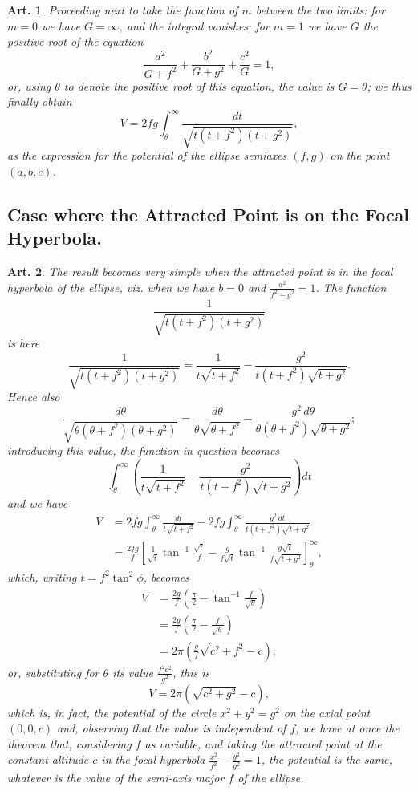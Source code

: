 \documentclass[12pt,a4paper]{article}
\theoremstyle{cayley}
\newtheorem{art}{Art.}[section]
\begin{document}
\begin{art}
Proceeding next to take the function of $m$ between the two limits: for $m=0$ we have $G=\infty$, and the integral vanishes; for $m=1$ we have $G$ the positive root of the equation
\[
\frac{a^2}{G + f^2} + \frac{b^2}{G + g^2} + \frac{c^2}{G} = 1,
\]
or, using $\theta$ to denote the positive root of this equation, the value is $G = \theta$; we thus finally obtain
\[
V = 2fg\int_{\theta}^{\infty} \frac{dt}{\sqrt{t(t + f^2)(t + g^2)}},
\]
as the expression for the potential of the ellipse semiaxes $(f,g)$ on the point $(a,b,c)$.
\end{art}

\subsection*{Case where the Attracted Point is on the Focal Hyperbola.}

\begin{art}
The result becomes very simple when the attracted point is in the focal hyperbola of the ellipse, viz. when we have $b=0$ and $\frac{a^2}{f^2 - g^2} = 1$. The function
\[
\frac{1}{\sqrt{t(t + f^2)(t + g^2)}}
\]
is here
\[
\frac{1}{\sqrt{t(t + f^2)(t + g^2)}} = \frac{1}{t\sqrt{t + f^2}} - \frac{g^2}{t(t + f^2)\sqrt{t + g^2}}.
\]
Hence also
\[
\frac{d\theta}{\sqrt{\theta(\theta + f^2)(\theta + g^2)}} = \frac{d\theta}{\theta\sqrt{\theta + f^2}} - \frac{g^2\,d\theta}{\theta(\theta + f^2)\sqrt{\theta + g^2}};
\]
introducing this value, the function in question becomes
\[
\int_{\theta}^{\infty} \left(\frac{1}{t\sqrt{t + f^2}} - \frac{g^2}{t(t + f^2)\sqrt{t + g^2}}\right) dt
\]
and we have
\begin{align*}
V &= 2fg\int_{\theta}^{\infty} \frac{dt}{t\sqrt{t + f^2}} - 2fg\int_{\theta}^{\infty} \frac{g^2\,dt}{t(t + f^2)\sqrt{t + g^2}} \\
&= \frac{2fg}{f}\left[\frac{1}{\sqrt{t}}\tan^{-1}\frac{\sqrt{t}}{f} - \frac{g}{f\sqrt{t}}\tan^{-1}\frac{g\sqrt{t}}{f\sqrt{t + g^2}}\right]_{\theta}^{\infty},
\end{align*}
which, writing $t = f^2\tan^2\phi$, becomes
\begin{align*}
V &= \frac{2g}{f}\left(\frac{\pi}{2} - \tan^{-1}\frac{f}{\sqrt{\theta}}\right) \\
&= \frac{2g}{f}\left(\frac{\pi}{2} - \frac{f}{\sqrt{\theta}}\right) \\
&= 2\pi\left(\frac{g}{f}\sqrt{c^2 + f^2} - c\right);
\end{align*}
or, substituting for $\theta$ its value $\frac{f^2c^2}{g^2}$, this is
\[
V = 2\pi(\sqrt{c^2 + g^2} - c),
\]
which is, in fact, the potential of the circle $x^2 + y^2 = g^2$ on the axial point $(0, 0, c)$ and, observing that the value is independent of $f$, we have at once the theorem that, considering $f$ as variable, and taking the attracted point at the constant altitude $c$ in the focal hyperbola $\frac{x^2}{f^2} - \frac{y^2}{g^2} = 1$, the potential is the same, whatever is the value of the semi-axis major $f$ of the ellipse.
\end{art}
\end{document}
